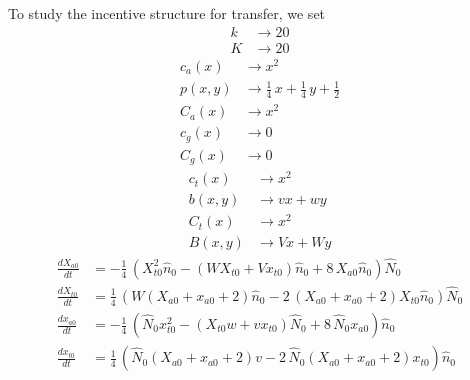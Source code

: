\documentclass{article}
\begin{document}
To study the incentive structure for transfer, we set\begin{align*}
  k &\to 20 \\
  K &\to 20
\end{align*}\begin{align*}
  c_a(x) &\to x^{2}\\
  p(x,y) &\to \frac{1}{4} \, x + \frac{1}{4} \, y + \frac{1}{2}\\
  C_a(x) &\to x^{2}\\
  c_g(x) &\to 0\\
  C_g(x) &\to 0
\end{align*}\begin{align*}
  c_t(x) &\to x^{2}\\
  b(x,y) &\to v x + w y\\
  C_t(x) &\to x^{2}\\
  B(x,y) &\to V x + W y
\end{align*}\iflatexml
\begin{align*}
\frac{d{X}_{{a}{0}}}{dt} &= -\frac{1}{4} \, {\left({X}_{{t}{0}}^{2} \hat{{n}}_{0} - {\left(W {X}_{{t}{0}} + V {x}_{{t}{0}}\right)} \hat{{n}}_{0} + 8 \, {X}_{{a}{0}} \hat{{n}}_{0}\right)} \hat{{N}}_{0}\\
\frac{d{X}_{{t}{0}}}{dt} &= \frac{1}{4} \, {\left(W {\left({X}_{{a}{0}} + {x}_{{a}{0}} + 2\right)} \hat{{n}}_{0} - 2 \, {\left({X}_{{a}{0}} + {x}_{{a}{0}} + 2\right)} {X}_{{t}{0}} \hat{{n}}_{0}\right)} \hat{{N}}_{0}\\
\frac{d{x}_{{a}{0}}}{dt} &= -\frac{1}{4} \, {\left(\hat{{N}}_{0} {x}_{{t}{0}}^{2} - {\left({X}_{{t}{0}} w + v {x}_{{t}{0}}\right)} \hat{{N}}_{0} + 8 \, \hat{{N}}_{0} {x}_{{a}{0}}\right)} \hat{{n}}_{0}\\
\frac{d{x}_{{t}{0}}}{dt} &= \frac{1}{4} \, {\left(\hat{{N}}_{0} {\left({X}_{{a}{0}} + {x}_{{a}{0}} + 2\right)} v - 2 \, \hat{{N}}_{0} {\left({X}_{{a}{0}} + {x}_{{a}{0}} + 2\right)} {x}_{{t}{0}}\right)} \hat{{n}}_{0}
\end{align*}
\else
\end{document}
